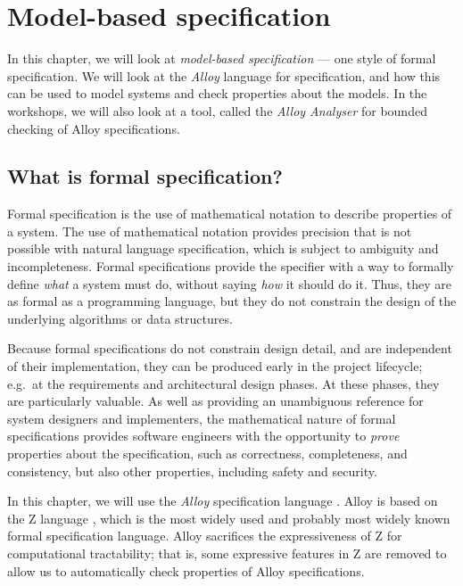 \chapter{Model-based specification}
\label{chapter:specification}

In this chapter, we will look at \emph{model-based specification} --- one style of formal specification. We will look at the \emph{Alloy} language for specification, and how this can be used to model systems and check properties about the models. In the workshops, we will also look at a tool, called the \emph{Alloy Analyser} for bounded checking of Alloy specifications.

\section{What is formal specification?}

Formal specification is the use of mathematical notation to describe properties of a system. The use of mathematical notation provides precision that is not possible with natural language specification, which is subject to ambiguity and incompleteness. Formal specifications provide the specifier with a way to formally define \emph{what} a system must do, without saying \emph{how} it should do it. Thus, they are as formal as a programming language, but they do not constrain the design of the underlying algorithms or data structures.

Because formal specifications do not constrain design detail, and are independent of their implementation, they can be produced early in the project lifecycle; e.g.\ at the requirements and architectural design phases. At these phases, they are particularly valuable. As well as providing an unambiguous reference for system designers and implementers, the mathematical nature of formal specifications provides software engineers with the opportunity to \emph{prove} properties about the specification, such as correctness, completeness, and consistency, but also other properties, including safety and security.

In this chapter, we will use the \emph{Alloy} specification language \cite{jackson2012software}. Alloy is based on the Z language \cite{woodcock-using-z}, which is the most widely used and probably most widely known formal specification language. Alloy sacrifices the expressiveness of Z for computational tractability; that is, some expressive features in Z are removed to allow us to automatically check properties of Alloy specifications.

